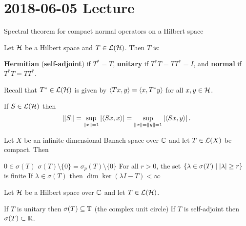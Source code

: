 \section{2018-06-05 Lecture}

Spectral theorem for compact normal operators on a Hilbert space

\begin{defn}
  Let $\mathcal{H}$ be a Hilbert space and $T \in \mathcal{L}(\mathcal{H})$.
  Then $T$ is:
  \begin{enum}
    \io \textbf{Hermitian} (\textbf{self-adjoint}) if $T^*=T$,
    \io \textbf{unitary} if $T^*T=TT^*=I$, and
    \io \textbf{normal} if $T^*T=TT^*$.
  \end{enum}
  Recall that $T^* \in \mathcal{L}(\mathcal{H})$ is given by ${\left\langle Tx,y \right\rangle}={\left\langle x,T^*y \right\rangle}$ for all $x,y \in \mathcal{H}$.
\end{defn}

\begin{exer}
  If $S \in \mathcal{L}(\mathcal{H})$ then
  \[ \left\lVert S \right\rVert = \sup_{\left\lVert x \right\rVert=1} \left\lvert {\left\langle Sx,x \right\rangle} \right\rvert = \sup_{\left\lVert x \right\rVert=\left\lVert y \right\rVert=1} \left\lvert {\left\langle Sx,y \right\rangle} \right\rvert. \]
\end{exer}

\begin{thm}
  Let $X$ be an infinite dimensional Banach space over $\mathbb{C}$ and let $T \in \mathcal{L}(X)$ be compact.
  Then
  \begin{enum}
    \io $0 \in \sigma(T)$
    \io $\sigma(T) \setminus \{0\} = \sigma_p(T) \setminus \{0\}$
    \io For all $r>0$, the set $\{ \lambda \in \sigma(T) \mid \left\lvert \lambda \right\rvert \geq r \}$ is finite
    \io If $\lambda \in \sigma(T)$ then $\dim\ker(\lambda I-T)<\infty$
  \end{enum}
\end{thm}

\begin{prop}
  Let $\mathcal{H}$ be a Hilbert space over $\mathbb{C}$ and let $T \in \mathcal{L}(\mathcal{H})$.
  \begin{enum}
    \io
    If $T$ is unitary then $\sigma(T) \subseteq \mathbb{T}$ (the complex unit circle)
    \io
    If $T$ is self-adjoint then $\sigma(T) \subset \mathbb{R}$.
  \end{enum}
\end{prop}

